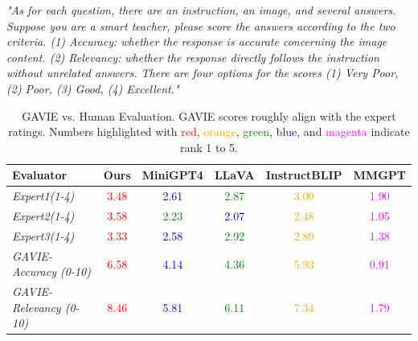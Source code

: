 \textit{"As for each question, there are an instruction, an image, and several answers. Suppose you are a smart teacher, please score the answers according to the two criteria. (1) Accuracy: whether the response is accurate concerning the image content. (2) Relevancy: whether the response directly follows the instruction without unrelated answers. There are four options for the scores (1) Very Poor, (2) Poor, (3) Good, (4) Excellent."}

\begin{table}[h]
\setlength\tabcolsep{3pt}
\centering
\small
\begin{tabular}{lccccc}
\toprule[1.5pt]
Evaluator& Ours & MiniGPT4 & LLaVA & InstructBLIP & MMGPT\\
\midrule
\textit{Expert1(1-4)}& \textcolor{red}{3.48} & \textcolor{blue}{2.61} & \textcolor{green}{2.87} & \textcolor{orange}{3.00} & \textcolor{magenta}{1.90}\\
\textit{Expert2(1-4)} &\textcolor{red}{3.58}& \textcolor{green}{2.23}& \textcolor{blue}{2.07}& \textcolor{orange}{2.48}& \textcolor{magenta}{1.05}\\
\textit{Expert3(1-4)} & \textcolor{red}{3.33} & \textcolor{blue}{2.58} & \textcolor{green}{2.92} & \textcolor{orange}{2.89} & \textcolor{magenta}{1.38}\\
\midrule
\textit{GAVIE-Accuracy (0-10)} & \textcolor{red}{6.58} & \textcolor{blue}{4.14} & \textcolor{green}{4.36} & \textcolor{orange}{5.93} & \textcolor{magenta}{0.91}\\
\textit{GAVIE-Relevancy (0-10)}  & \textcolor{red}{8.46} & \textcolor{blue}{5.81} & \textcolor{green}{6.11} & \textcolor{orange}{7.34} & \textcolor{magenta}{1.79}\\
\bottomrule
\end{tabular}
\vspace{0.06in}
\caption{GAVIE vs. Human Evaluation. GAVIE scores roughly align with the expert ratings. Numbers highlighted with \textcolor{red}{red}, \textcolor{orange}{orange}, \textcolor{green}{green}, \textcolor{blue}{blue}, and \textcolor{magenta}{magenta} indicate rank 1 to 5.
}
\label{tab:appendix_human}
\vspace{-0.2in}
\end{table}

